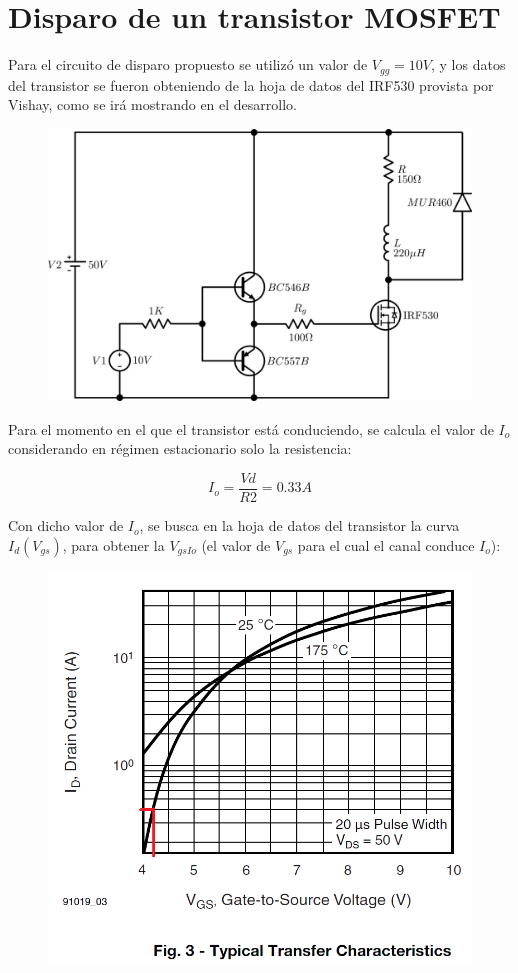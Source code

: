 \documentclass[e4_tp1_main.tex]{subfiles}
\begin{document}
\section{Disparo de un transistor MOSFET}

Para el circuito de disparo propuesto se utilizó un valor de $V_{gg}=10V$, y los datos del transistor se fueron obteniendo de la hoja de datos del IRF530 provista por Vishay, como se irá mostrando en el desarrollo.

\begin{figure}[H]
\centering
\includegraphics[width=0.7\linewidth]{Images/CircuitoDisparo.png}
\end{figure}

Para el momento en el que el transistor está conduciendo, se calcula el valor de $I_o$ considerando en régimen estacionario solo la resistencia:

\[
I_o = \frac{Vd}{R2} = 0.33A
\]

Con dicho valor de $I_o$, se busca en la hoja de datos del transistor la curva $I_d(V_{gs})$, para obtener la $V_{gsIo}$ (el valor de $V_{gs}$ para el cual el canal conduce $I_o$):

\begin{figure}[H]
\centering
\includegraphics[width=0.5\linewidth]{Images/Ej1-VgsIo.png}
\end{figure}
\end{document}
